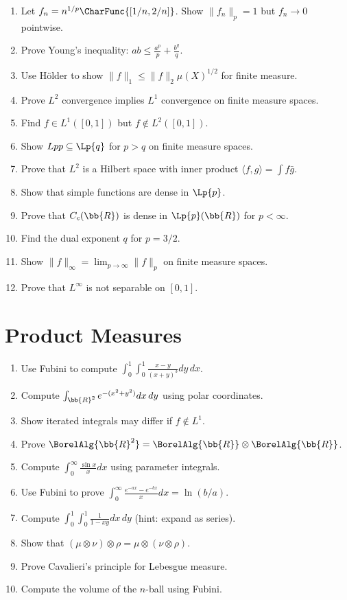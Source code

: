\begin{enumerate}
    \item Let $f_n = n^{1/p} \CharFunc{[1/n, 2/n]}$. Show $\|f_n\|_p = 1$ but $f_n \to 0$ pointwise.
    \item Prove Young's inequality: $ab \leq \frac{a^p}{p} + \frac{b^q}{q}$.
    \item Use Hölder to show $\|f\|_1 \leq \|f\|_2 \mu(X)^{1/2}$ for finite measure.
    \item Prove $L^2$ convergence implies $L^1$ convergence on finite measure spaces.
    \item Find $f \in L^1([0,1])$ but $f \notin L^2([0,1])$.
    \item Show $\\Lp{p} \subseteq \Lp{q}$ for $p > q$ on finite measure spaces.
    \item Prove that $L^2$ is a Hilbert space with inner product $\langle f, g \rangle = \int f \bar{g}$.
    \item Show that simple functions are dense in $\Lp{p}$.
    \item Prove that $C_c(\bb{R})$ is dense in $\Lp{p}(\bb{R})$ for $p < \infty$.
    \item Find the dual exponent $q$ for $p = 3/2$.
    \item Show $\|f\|_\infty = \lim_{p \to \infty} \|f\|_p$ on finite measure spaces.
    \item Prove that $L^\infty$ is not separable on $[0,1]$.
\end{enumerate}

\section{Product Measures}

\begin{enumerate}
    \item Use Fubini to compute $\int_0^1 \int_0^1 \frac{x-y}{(x+y)^3} dy\, dx$.
    \item Compute $\int_{\bb{R}^2} e^{-(x^2+y^2)} dx\, dy$ using polar coordinates.
    \item Show iterated integrals may differ if $f \notin L^1$.
    \item Prove $\BorelAlg{\bb{R}^2} = \BorelAlg{\bb{R}} \otimes \BorelAlg{\bb{R}}$.
    \item Compute $\int_0^\infty \frac{\sin x}{x} dx$ using parameter integrals.
    \item Use Fubini to prove $\int_0^\infty \frac{e^{-ax} - e^{-bx}}{x} dx = \ln(b/a)$.
    \item Compute $\int_0^1 \int_0^1 \frac{1}{1-xy} dx\, dy$ (hint: expand as series).
    \item Show that $(\mu \otimes \nu) \otimes \rho = \mu \otimes (\nu \otimes \rho)$.
    \item Prove Cavalieri's principle for Lebesgue measure.
    \item Compute the volume of the $n$-ball using Fubini.
\end{enumerate}

